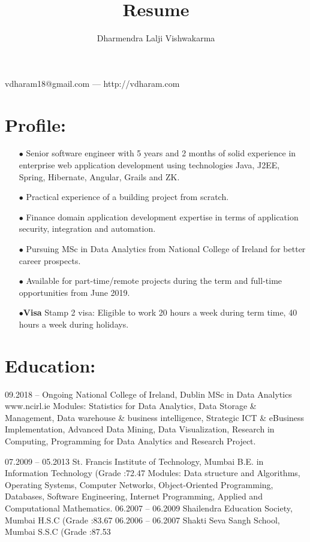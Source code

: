 \documentclass{article}
\makeatletter
\renewcommand{\maketitle}{
\begin{center}
{\huge\bfseries
\theauthor}

\vspace{0.25em}
vdharam18@gmail.com --- http://vdharam.com
\end{center}	
}
\makeatother
\begin{document}
\title{Resume}
\author{Dharmendra Lalji Vishwakarma}
\maketitle

\section{Profile:}
\begin{itemize}
	
\item[$\bullet$]
Senior software engineer with 5 years and 2 months of solid experience in enterprise web application development using technologies Java, J2EE, Spring, Hibernate, Angular, Grails and ZK.
\item[$\bullet$]
Practical experience of a building project from scratch.
\item[$\bullet$]
Finance domain application development expertise in terms of application security, integration and automation.
\item[$\bullet$]
Pursuing MSc in Data Analytics from National College of Ireland for better career prospects.
\item[$\bullet$]
Available for part-time/remote projects during the term and full-time opportunities from June 2019.
\item[$\bullet$\bfseries Visa]
Stamp 2 visa: Eligible to work 20 hours a week during term time, 40 hours a week during holidays.

	 
\end{itemize}

\section{Education:}

09.2018 – Ongoing National College of Ireland, Dublin
\linebreak
MSc in Data Analytics www.ncirl.ie
Modules: Statistics for Data Analytics, Data Storage \& Management, Data warehouse \& business intelligence, Strategic ICT \& eBusiness Implementation, Advanced Data Mining, Data Visualization, Research in Computing, Programming for Data Analytics and Research Project.

07.2009 – 05.2013 St. Francis Institute of Technology, Mumbai
B.E. in Information Technology (Grade :72.47%
Modules: Data structure and Algorithms, Operating Systems, Computer Networks, Object-Oriented Programming, Databases, Software Engineering, Internet Programming, Applied and Computational Mathematics.
06.2007 – 06.2009 Shailendra Education Society, Mumbai
H.S.C (Grade :83.67%
06.2006 – 06.2007 Shakti Seva Sangh School, Mumbai
S.S.C (Grade :87.53%
\end{document}
